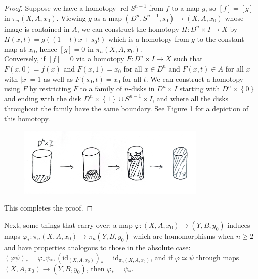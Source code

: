 \documentclass[reqno]{amsart}
\theoremstyle{definition}
\theoremstyle{remark}
\DeclareMathOperator{\rel}{rel}
\newcommand{\id}{{\mathrm{id}}}
\begin{document}
  \begin{proof}
      Suppose we have a homotopy
      $\rel S^{n-1}$ from $f$ to a map
      $g$, so
      $\left[ f \right] = \left[ g \right] $ in
      $\pi_n \left( X, A, x_0 \right) $. 
      Viewing $g$ as a map
      $\left( D^{n}, S^{n-1}, s_0 \right) 
      \to \left( X, A, x_0 \right) $ whose
      image is contained in $A$, we
      can construct the homotopy
      $H \colon D^{n} \times I \to X$ by
      $H(x,t) = g\left( (1-t) x + s_0 t \right) $ 
      which is a homotopy from $g$ to the
      constant map at $x_0$, hence
      $\left[ g \right]  = 0$ in $\pi_n (X, A, x_0)$.\\
      Conversely, if $\left[ f \right] = 0$ via
      a homotopy $F \colon D^{n} \times I \to X$ such that
      $F(x,0) = f(x)$ and
      $F(x,1) = x_0$ for all $x \in D^{n}$ and
      $F(x,t) \in A$ for all
      $x$ with $\left| x \right| = 1$ as well
      as $F(s_0,t) = x_0$ for all $t$. We can
      construct a homotopy
      using $F$ by restricting $F$ to a family of
      $n$-disks in $D^{n} \times I$ starting with
      $D^{n}\times \left\{ 0 \right\} $ and ending
      with the disk $D^{n} \times \left\{ 1 \right\} 
      \cup S^{n-1} \times I$, and where all the disks
      throughout the family have the same boundary.
      See Figure \ref{fig:DJIMMXKXO0O-jpeg} for a depiction
      of this homotopy.

      \begin{figure}[htpb]
          \centering
          \includegraphics[width=0.8\textwidth]{Figures/DJIMMXKXO0O.jpeg}
          \caption{}
          \label{fig:DJIMMXKXO0O-jpeg}
      \end{figure}
      This completes the proof.
  \end{proof}

  Next, some things that carry over:
  a map $\varphi \colon \left( X, A, x_0 \right) 
  \to \left( Y, B, y_0 \right) $ induces maps
  $\varphi_* \colon \pi_n \left( X, A, x_0 \right) 
  \to \pi_n \left( Y, B, y_0 \right) $ which are
  homomorphisms when $n\ge 2$ and have properties analogous
  to those in the absolute case: 
  $\left( \varphi \psi  \right)_* = 
  \varphi_* \psi_*, (\id_{(X,A,x_0)})_{*} = \id_{\pi_n (X, A, x_0)}$,
  and if  $\varphi \simeq \psi $ through maps
  $\left( X,A,x_0 \right) \to \left( Y,B,y_0 \right) $,
  then $\varphi_* = \psi_*$. 
\end{document}
